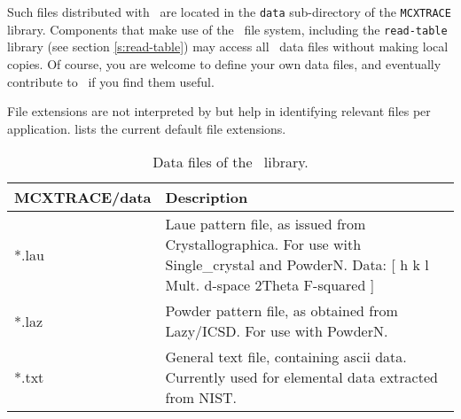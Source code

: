 Such files distributed with \MCX\ are located in the
\verb+data+ sub-directory of the \verb+MCXTRACE+ library.
Components that make use of the \MCX\ file system,
including the \verb+read-table+ library (see section \ref{s:read-table})
may access all \MCX\ data files without making local copies.
Of course, you are welcome to define your own data files,
and eventually contribute to \MCX\ if you find them useful.

File extensions are not interpreted by \MCX but help in identifying relevant files per
application.  lists the current default file extensions.
\begin{table}
  \begin{center}
    {\let\my=\\
    \begin{tabular}{|p{}|p{}|}
      \hline
       \textbf{MCXTRACE/data} & Description \\
       \hline
 *.lau & Laue pattern file, as issued from Crystallographica.
       For use with Single\_crystal and PowderN.
       Data: [ h   k   l Mult. d-space 2Theta   F-squared ] \\
 *.laz & Powder pattern file, as obtained from Lazy/ICSD.
       For use with PowderN.\\
 *.txt & General text file, containing ascii data. Currently used for elemental data extracted from NIST\cite{NIST-ffast}.\\
      \hline
    \end{tabular}
    \caption{Data files of the \MCX\ library.}
    \label{t:comp-data}
    }
  \end{center}
\end{table}


